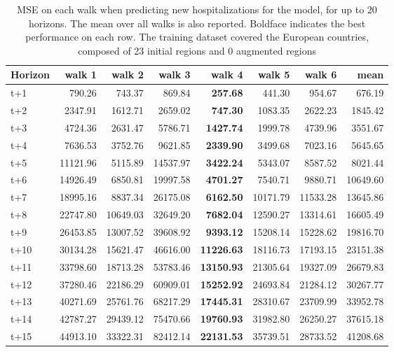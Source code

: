 \begin{table}[H]
\centering
\caption{MSE on each walk when predicting new hospitalizations for the model, for up to 20 horizons. The mean over all walks is also reported. Boldface indicates the best performance on each row. The training dataset covered the European countries, composed of 23 initial regions and 0 augmented regions }
\label{tab:MSE_walk_baseline}
\begin{tabular}{lrrrrrrr}
\toprule
Horizon &   walk 1 &   walk 2 &    walk 3 &   walk 4 &   walk 5 &   walk 6 &     mean \\
\midrule
t+1  & 790.26  & 743.37  & 869.84  & \textbf{257.68}  & 441.30  & 954.67  & 676.19  \\
t+2  & 2347.91  & 1612.71  & 2659.02  & \textbf{747.30}  & 1083.35  & 2622.23  & 1845.42  \\
t+3  & 4724.36  & 2631.47  & 5786.71  & \textbf{1427.74}  & 1999.78  & 4739.96  & 3551.67  \\
t+4  & 7636.53  & 3752.76  & 9621.85  & \textbf{2339.90}  & 3499.68  & 7023.16  & 5645.65  \\
t+5  & 11121.96  & 5115.89  & 14537.97  & \textbf{3422.24}  & 5343.07  & 8587.52  & 8021.44  \\
t+6  & 14926.49  & 6850.81  & 19997.58  & \textbf{4701.27}  & 7540.71  & 9880.71  & 10649.60  \\
t+7  & 18995.16  & 8837.34  & 26175.08  & \textbf{6162.50}  & 10171.79  & 11533.28  & 13645.86  \\
t+8  & 22747.80  & 10649.03  & 32649.20  & \textbf{7682.04}  & 12590.27  & 13314.61  & 16605.49  \\
t+9  & 26453.85  & 13007.52  & 39608.92  & \textbf{9393.12}  & 15208.14  & 15228.62  & 19816.70  \\
t+10  & 30134.28  & 15621.47  & 46616.00  & \textbf{11226.63}  & 18116.73  & 17193.15  & 23151.38  \\
t+11  & 33798.60  & 18713.28  & 53783.46  & \textbf{13150.93}  & 21305.64  & 19327.09  & 26679.83  \\
t+12  & 37280.46  & 22186.29  & 60909.01  & \textbf{15252.92}  & 24693.84  & 21284.12  & 30267.77  \\
t+13  & 40271.69  & 25761.76  & 68217.29  & \textbf{17445.31}  & 28310.67  & 23709.99  & 33952.78  \\
t+14  & 42787.27  & 29439.12  & 75470.66  & \textbf{19760.93}  & 31982.80  & 26250.27  & 37615.18  \\
t+15  & 44913.10  & 33322.31  & 82412.14  & \textbf{22131.53}  & 35739.51  & 28733.52  & 41208.68  \\

\end{tabular}
\end{table}
